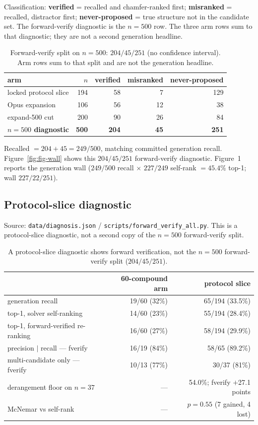 \documentclass[11pt]{article}
\begin{document}
Classification:
\textbf{verified} = recalled and chamfer-ranked first;
\textbf{misranked} = recalled, distractor first;
\textbf{never-proposed} = true structure not in the candidate set.
The forward-verify diagnostic is the $n{=}500$ row.
The three arm rows sum to that diagnostic; they are not a second generation headline.

\begin{table}[h]
\caption{Forward-verify split on $n{=}500$: $204/45/251$
(no confidence interval).
Arm rows sum to that split and are not the generation headline.}
\centering
\small
\begin{tabular}{@{}lrrrr@{}}
\toprule
arm & $n$ & verified & misranked & never-proposed \\
\midrule
locked protocol slice & 194 & 58 & 7 & 129 \\
Opus expansion & 106 & 56 & 12 & 38 \\
expand-500 cut & 200 & 90 & 26 & 84 \\
\textbf{$n{=}500$ diagnostic} & \textbf{500} & \textbf{204} & \textbf{45} & \textbf{251} \\
\bottomrule
\end{tabular}
\end{table}

Recalled $=204+45=249/500$, matching committed generation recall.
Figure~\ref{fig:fig-wall} shows this $204/45/251$ forward-verify diagnostic.
Figure~1 reports the generation wall
($249/500$ recall $\times$ $227/249$ self-rank $=45.4\%$ top-1; wall $227/22/251$).

\subsection{Protocol-slice diagnostic}

Source: \texttt{data/diagnosis.json} / \texttt{scripts/forward\_verify\_all.py}.
This is a protocol-slice diagnostic, not a second copy of the $n{=}500$ forward-verify split.

\begin{table}[h]
\caption{A protocol-slice diagnostic shows forward verification,
not the $n{=}500$ forward-verify split ($204/45/251$).}
\centering
\begin{tabular}{@{}lrr@{}}
\toprule
 & 60-compound arm & protocol slice \\
\midrule
generation recall & 19/60 (32\%) & 65/194 (33.5\%) \\
top-1, solver self-ranking & 14/60 (23\%) & 55/194 (28.4\%) \\
top-1, forward-verified re-ranking & 16/60 (27\%) & 58/194 (29.9\%) \\
precision $|$ recall --- fverify & 16/19 (84\%) & 58/65 (89.2\%) \\
multi-candidate only --- fverify & 10/13 (77\%) & 30/37 (81\%) \\
derangement floor on $n{=}37$ & --- & 54.0\%; fverify $+$27.1 points \\
McNemar vs self-rank & --- & $p{=}0.55$ (7 gained, 4 lost) \\
\bottomrule
\end{tabular}
\end{table}
\end{document}
